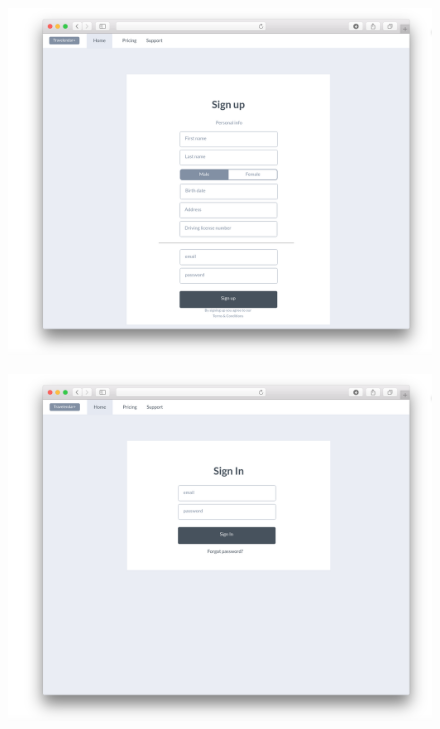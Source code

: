 \documentclass{article}
\begin{document}
	\bigskip
	\begin{figure}[!ht]
	\centering
	\includegraphics[height=0.5\textheight]{img/mockups/web/register.png}
	\caption{}
	\end{figure}
	\clearpage

	\begin{figure}[!ht]
	\centering
	\includegraphics[height=0.4\textheight]{img/mockups/web/login.png}
	\caption{}
	\end{figure}
\end{document}

